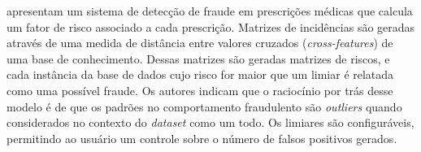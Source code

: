 \citet{Aral2011} apresentam um sistema de detecção de fraude em prescrições médicas que calcula um fator de risco associado a cada prescrição. Matrizes de incidências são geradas através de uma medida de distância entre valores cruzados (\emph{cross-features}) de uma base de conhecimento. Dessas matrizes são geradas matrizes de riscos, e cada instância da base de dados cujo risco for maior que um limiar é relatada como uma possível fraude. Os autores indicam que o raciocínio por trás desse modelo é de que os padrões no comportamento fraudulento são \emph{outliers} quando considerados no contexto do \emph{dataset} como um todo. Os limiares são configuráveis, permitindo ao usuário um controle sobre o número de falsos positivos gerados.
